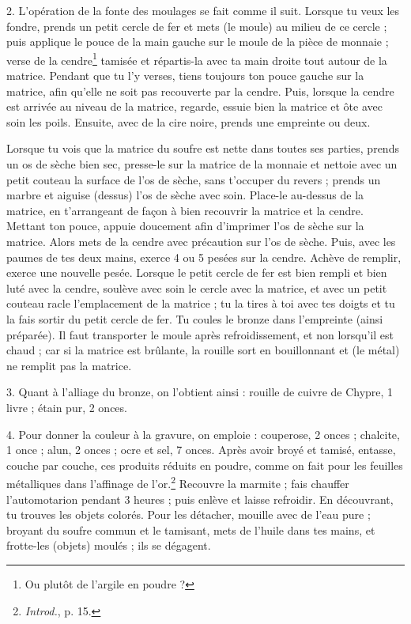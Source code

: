 \documentclass[a4paper, 11pt, oneside, polutonikogreek, french]{article}
\begin{document}
2. L'opération de la fonte des moulages se fait comme il suit. Lorsque tu veux les fondre, prends un petit cercle de fer et mets (le moule) au milieu de ce cercle ; puis applique le pouce de la main gauche sur le moule de la pièce de monnaie ; verse de la cendre\footnote{Ou plutôt de l'argile en poudre ?} tamisée et répartis-la avec ta main droite tout autour de la matrice. Pendant que tu l'y verses, tiens toujours ton pouce gauche sur la matrice, afin qu'elle ne soit pas recouverte par la cendre. Puis, lorsque la cendre est arrivée au niveau de la matrice, regarde, essuie bien la matrice et ôte avec soin les poils. Ensuite, avec de la cire noire, prends une empreinte ou deux.

Lorsque tu vois que la matrice du soufre est nette dans toutes ses parties, prends un os de sèche bien sec, presse-le sur la matrice de la monnaie et nettoie avec un petit couteau la surface de l'os de sèche, sans t'occuper du revers ; prends un marbre et aiguise (dessus) l'os de sèche avec soin. Place-le au-dessus de la matrice, en t'arrangeant de façon à bien recouvrir la matrice et la cendre. Mettant ton pouce, appuie doucement afin d'imprimer l'os de sèche sur la matrice. Alors mets de la cendre avec précaution sur l'os de sèche. Puis, avec les paumes de tes deux mains, exerce 4 ou 5 pesées sur la cendre. Achève de remplir, exerce une nouvelle pesée. Lorsque le petit cercle de fer est bien rempli et bien luté avec la cendre, soulève avec soin le cercle avec la matrice, et avec un petit couteau racle l'emplacement de la matrice ; tu la tires à toi avec tes doigts et tu la fais sortir du petit cercle de fer. Tu coules le bronze dans l'empreinte (ainsi préparée). Il faut transporter le moule après refroidissement, et non lorsqu'il est chaud ; car si la matrice est brûlante, la rouille sort en bouillonnant et (le métal) ne remplit pas la matrice.

3. Quant à l'alliage du bronze, on l'obtient ainsi : rouille de cuivre de Chypre, 1 livre ; étain pur, 2 onces.

4. Pour donner la couleur à la gravure, on emploie : couperose, 2 onces ; chalcite, 1 once ; alun, 2 onces ; ocre et sel, 7 onces. Après avoir broyé et tamisé, entasse, couche par couche, ces produits réduits en poudre, comme on fait pour les feuilles métalliques dans l'affinage de l'or.\footnote{\emph{Introd.}, p. 15.} Recouvre la marmite ; fais chauffer l'automotarion pendant 3 heures ; puis enlève et laisse refroidir. En découvrant, tu trouves les objets colorés. Pour les détacher, mouille avec de l'eau pure ; broyant du soufre commun et le tamisant, mets de l'huile dans tes mains, et frotte-les (objets) moulés ; ils se dégagent.
\end{document}
